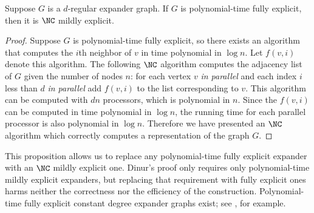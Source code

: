 \begin{proposition}
  Suppose $G$ is a $d$-regular expander graph.
  If $G$ is polynomial-time fully explicit, then it is $\NC$ mildly explicit.
\end{proposition}
\begin{proof}

  Suppose $G$ is polynomial-time fully explicit, so there exists an algorithm that computes the $i$th neighbor of $v$ in time polynomial in $\log n$.
  Let $f(v, i)$ denote this algorithm.
  The following $\NC$ algorithm computes the adjacency list of $G$ given the number of nodes $n$: for each vertex $v$ \emph{in parallel} and each index $i$ less than $d$ \emph{in parallel} add $f(v, i)$ to the list corresponding to $v$.
  This algorithm can be computed with $dn$ processors, which is polynomial in $n$.
  Since the $f(v, i)$ can be computed in time polynomial in $\log n$, the running time for each parallel processor is also polynomial in $\log n$.
  Therefore we have presented an $\NC$ algorithm which correctly computes a representation of the graph $G$.
\end{proof}

This proposition allows us to replace any polynomial-time fully explicit expander %
with an $\NC$ mildly explicit one.
Dinur's proof only requires only polynomial-time mildly explicit expanders, but replacing that requirement with fully explicit ones harms neither the correctness nor the efficiency of the construction.
Polynomial-time fully explicit constant degree expander graphs exist; see \autocite{rvw00}, for example.

